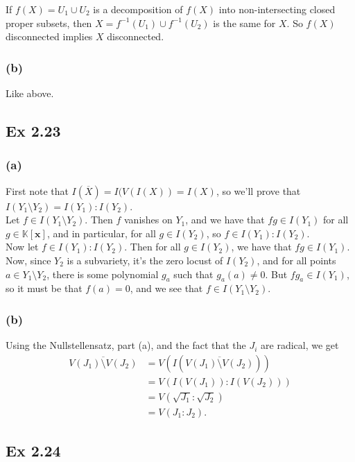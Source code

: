 \documentclass{article}
\theoremstyle{definition}
\newcommand{\K}{\mathbb{K}}
\newcommand{\Kx}{\K[\bm{x}]}
\begin{document}
If $f(X) = U_1 \cup U_2$ is a decomposition of $f(X)$ into non-intersecting
closed proper subsets, then $X = f^{-1}(U_1) \cup f^{-1}(U_2)$ is the same for
$X$. So $f(X)$ disconnected implies $X$ disconnected.

\subsubsection*{(b)}

Like above.

\subsection*{Ex 2.23}

\subsubsection*{(a)}

First note that $I(\overline{X}) = I(V(I(X)) = I(X)$, so
we'll prove that $I(Y_1 \setminus Y_2) = I(Y_1) : I(Y_2)$. \\

Let $f \in I(Y_1 \setminus Y_2)$. Then $f$ vanishes on $Y_1$, and we have that 
$f g \in I(Y_1)$ for all $g \in \Kx$, and in particular, for all $g \in I(Y_2)$,
so $f \in I(Y_1) : I(Y_2)$. \\

Now let $f \in I(Y_1) : I(Y_2)$. Then for all $g \in I(Y_2)$, we have that $fg
\in I(Y_1)$. Now, since $Y_2$ is a subvariety, it's the zero locust of
$I(Y_2)$, and for all points $a \in Y_1 \setminus Y_2$, there is some
polynomial $g_a$ such that $g_a(a) \not = 0$. But $fg_{a} \in I(Y_1)$, so it
must be that $f(a) = 0$, and we see that $f \in I(Y_1 \setminus Y_2)$.

\subsubsection*{(b)}
Using the Nullstellensatz, part (a), and the fact that the $J_i$ are radical,
we get
\begin{align*}
	\overline{V(J_1) \setminus V(J_2)}
	&= V(I(\overline{V(J_1) \setminus V(J_2)})) \\
	&= V(I(V(J_1)) : I(V(J_2))) \\
	&= V(\sqrt{J_1} : \sqrt{J_2}) \\
	&= V(J_1 : J_2).
\end{align*}


\subsection*{Ex 2.24} 
\end{document}
